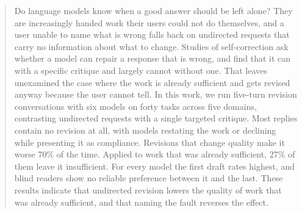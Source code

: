 \begin{abstract}
Do language models know when a good answer should be left alone? They are increasingly
handed work their users could not do themselves, and a user unable to name what is wrong
falls back on undirected requests that carry no information about what to change. Studies of
self-correction ask whether a model can repair a response that is wrong, and find that it
can with a specific critique and largely cannot without one. That leaves unexamined the case
where the work is already sufficient and gets revised anyway because the user cannot tell.
In this work, we run five-turn revision conversations with six models on forty tasks across
five domains, contrasting undirected requests with a single targeted critique. Most replies
contain no revision at all, with models restating the work or declining while presenting it
as compliance. Revisions that change quality make it worse 70\% of the time. Applied to work
that was already sufficient, 27\% of them leave it insufficient. For every model the first
draft rates highest, and blind readers show no reliable preference between it and the last.
These results indicate that undirected revision lowers the quality of work that was already
sufficient, and that naming the fault reverses the effect.
\end{abstract}
